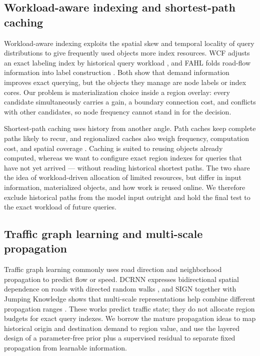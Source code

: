 \documentclass[5p,twocolumn,authoryear]{elsarticle}
\begin{document}
\subsection{Workload-aware indexing and shortest-path caching}

Workload-aware indexing exploits the spatial skew and temporal locality of query
distributions to give frequently used objects more index resources. WCF adjusts an
exact labeling index by historical query workload \citep{wan2022wcf}, and FAHL folds
road-flow information into label construction \citep{dan2025fahl}. Both show that
demand information improves exact querying, but the objects they manage are node
labels or index cores. Our problem is materialization choice inside a region overlay:
every candidate simultaneously carries a gain, a boundary connection cost, and
conflicts with other candidates, so node frequency cannot stand in for the decision.

Shortest-path caching uses history from another angle. Path caches keep complete paths
likely to recur, and regionalized caches also weigh frequency, computation cost, and
spatial coverage \citep{thomsen2012cache,li2020cache}. Caching is suited to reusing
objects already computed, whereas we want to configure exact region indexes for
queries that have not yet arrived --- without reading historical shortest paths. The
two share the idea of workload-driven allocation of limited resources, but differ in
input information, materialized objects, and how work is reused online. We therefore
exclude historical paths from the model input outright and hold the final test to the
exact workload of future queries.

\subsection{Traffic graph learning and multi-scale propagation}

Traffic graph learning commonly uses road direction and neighborhood propagation to
predict flow or speed. DCRNN expresses bidirectional spatial dependence on roads with
directed random walks \citep{li2018dcrnn}, and SIGN together with Jumping Knowledge
shows that multi-scale representations help combine different propagation ranges
\citep{frasca2020sign,xu2018jk}. These works predict traffic state; they do not
allocate region budgets for exact query indexes. We borrow the mature propagation
ideas to map historical origin and destination demand to region value, and use the
layered design of a parameter-free prior plus a supervised residual to separate fixed
propagation from learnable information.
\end{document}
